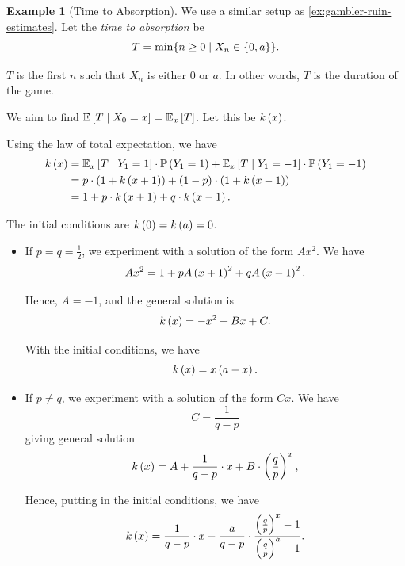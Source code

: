 \documentclass{article}
\theoremstyle{definition}
\newtheorem{example}[theorem]{Example}
\theoremstyle{remark}
\newcommand{\Prob}{\mathbb{P}}
\newcommand{\Expt}{\mathbb{E}}
\newcommand{\Conditional}[2]{#1\mid #2}
\newcommand{\set}[2]{\{#1\mid #2\}}
\begin{document}
\begin{example}[Time to Absorption]
    \label{ex:time-to-absorption}%
    We use a similar setup as \autoref{ex:gambler-ruin-estimates}. Let the \emph{time to absorption} be
    \[
        T = \min \set{n \geq 0}{X_n \in \Bqty{0, a}}.
    \]

    \(T\) is the first \(n\) such that \(X_n\) is either \(0\) or \(a\). In other words, \(T\) is the duration of the game.

    We aim to find \(\Expt\bqty{\Conditional{T}{X_0 = x}} = \Expt_x\bqty{T}\). Let this be \(k\left(x\right)\).

    Using the law of total expectation, we have
    \begin{align*}
        k\pqty{x} &= \Expt_x\bqty{\Conditional{T}{Y_1 = 1}} \cdot \Prob\pqty{Y_1 = 1} + \Expt_x\bqty{\Conditional{T}{Y_1 = -1}} \cdot \Prob\pqty{Y_1 = -1} \\
        &= p \cdot \pqty{1 + k\pqty{x + 1}} + \pqty{1 - p} \cdot \pqty{1 + k\pqty{x - 1}} \\
        &= 1 + p \cdot k\pqty{x + 1} + q \cdot k\pqty{x - 1}.
    \end{align*}

    The initial conditions are \(k \left(0\right) = k \left(a\right) = 0\).
    \begin{itemize}
        \item If \(p = q = \frac{1}{2}\), we experiment with a solution of the form \(A x^2\). We have
        \[
            A x^2 = 1 + p A\left(x + 1\right)^2 + q A\left(x - 1\right)^2.
        \]

        Hence, \(A = -1\), and the general solution is
        \[
            k\left(x\right)= -x^2 + Bx + C.
        \]

        With the initial conditions, we have
        \[
            k\left(x\right) = x \left(a - x\right).
        \]

        \item If \(p \neq q\), we experiment with a solution of the form \(Cx\). We have
        \[
            C = \frac{1}{q - p}
        \]
        giving general solution
        \[
            k\left(x\right) = A + \frac{1}{q - p} \cdot x + B \cdot \left(\frac{q}{p}\right)^x,
        \]

        Hence, putting in the initial conditions, we have
        \[
            k\left(x\right) = \frac{1}{q - p} \cdot x - \frac{a}{q - p} \cdot \frac{\left(\frac{q}{p}\right)^x - 1}{\left(\frac{q}{p}\right)^a - 1}.
        \]
    \end{itemize}
\end{example}
\end{document}
